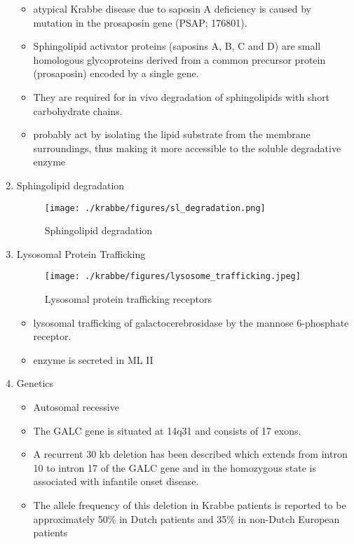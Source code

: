 \documentclass{scrartcl}
\begin{document}
\begin{enumerate}
\begin{itemize}
\item atypical Krabbe disease due to saposin A deficiency is caused by mutation in the prosaposin gene (PSAP; 176801).
\item Sphingolipid activator proteins (saposins A, B, C and D) are small
homologous glycoproteins derived from a common precursor protein
(prosaposin) encoded by a single gene.
\item They are required for in vivo degradation of sphingolipids with short carbohydrate chains.
\item probably act by isolating the lipid substrate from the membrane
surroundings, thus making it more accessible to the soluble
degradative enzyme
\end{itemize}

\item Sphingolipid degradation
\label{sec:orge0ced5e}

\begin{figure}[htbp]
\centering
\texttt{[image: ./krabbe/figures/sl\_degradation.png]}
\caption{\label{fig:org7ab0bcf}
Sphingolipid degradation}
\end{figure}

\item Lysosomal Protein Trafficking
\label{sec:orgc91a75f}

\begin{figure}[htbp]
\centering
\texttt{[image: ./krabbe/figures/lysosome\_trafficking.jpeg]}
\caption{\label{fig:org65eda82}
Lysosomal protein trafficking receptors}
\end{figure}

\footnotesize
\begin{itemize}
\item lysosomal trafficking of galactocerebrosidase by the mannose 6-phosphate receptor.
\item enzyme is secreted in ML II
\end{itemize}

\item Genetics
\label{sec:orgd7e134e}
\begin{itemize}
\item Autosomal recessive
\item The GALC gene is situated at 14q31 and consists of 17 exons.
\item A recurrent 30 kb deletion has been described which extends from
intron 10 to intron 17 of the GALC gene and in the homozygous state
is associated with infantile onset disease.
\item The allele frequency of this deletion in Krabbe patients is reported
to be approximately 50\% in Dutch patients and 35\% in non-Dutch
European patients
\end{itemize}
\end{enumerate}
\end{document}
